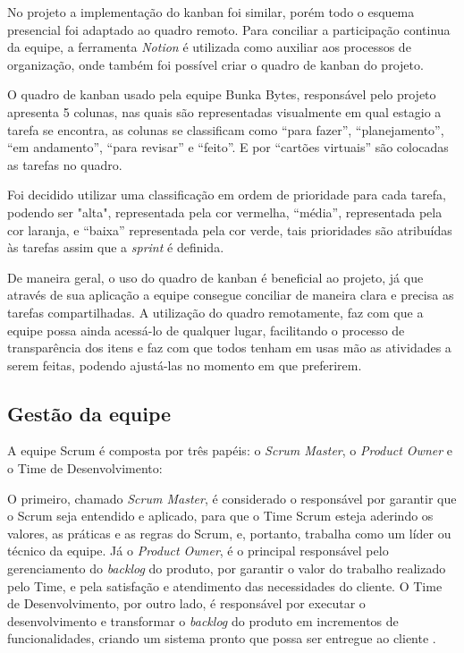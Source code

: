 No projeto  a implementação do kanban foi similar, porém todo o esquema presencial foi adaptado ao quadro remoto. Para conciliar a participação continua da equipe, a ferramenta \textsl{Notion} é utilizada como auxiliar aos processos de organização, onde também foi possível criar o quadro de kanban do projeto. 

O quadro de kanban usado pela equipe Bunka Bytes, responsável pelo projeto apresenta 5 colunas, nas quais são representadas visualmente em qual estagio a tarefa se encontra, as colunas se classificam como ``para fazer'', ``planejamento'', ``em andamento'', ``para revisar'' e ``feito''. E por ``cartões virtuais'' são colocadas as tarefas no quadro.

Foi decidido utilizar uma classificação em ordem de prioridade para cada tarefa, podendo ser "alta", representada pela cor vermelha, ``média'', representada pela cor laranja, e ``baixa'' representada pela cor verde, tais prioridades são atribuídas às tarefas assim que a \textsl{sprint} é definida.


De maneira geral, o uso do quadro de kanban é beneficial ao projeto, já que através de sua aplicação a equipe consegue conciliar de maneira clara e precisa as tarefas compartilhadas. A utilização do quadro remotamente, faz com que a equipe possa ainda acessá-lo de qualquer lugar, facilitando o processo de transparência dos itens e faz com que todos tenham em usas mão as atividades a serem feitas, podendo ajustá-las no momento em que preferirem. 




\subsection{Gestão da equipe}
A equipe Scrum é composta por três papéis: o \textsl{Scrum Master}, o \textsl{Product Owner} e o Time de Desenvolvimento:

\begin{citacao}

O primeiro, chamado \textsl{Scrum Master}, é considerado o responsável por garantir que o Scrum seja entendido e aplicado, para que o Time Scrum esteja aderindo os valores, as práticas e as regras do Scrum, e, portanto, trabalha como um líder ou técnico da equipe. Já o \textsl{Product Owner}, é o principal responsável pelo gerenciamento do \textsl{backlog} do produto, por garantir o valor do trabalho realizado pelo Time, e pela satisfação e atendimento das necessidades do cliente. O Time de Desenvolvimento, por outro lado, é responsável por executar o desenvolvimento e transformar o \textsl{backlog} do produto em incrementos de funcionalidades, criando um sistema pronto que possa ser entregue ao cliente \cite{cruz:2018}.

\end{citacao}


